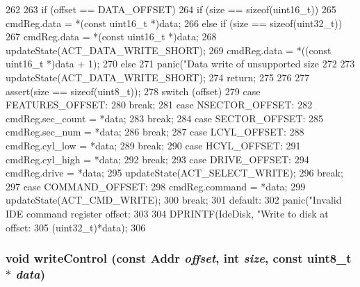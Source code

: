 \begin{DoxyCode}
262 {
263     if (offset == DATA_OFFSET) {
264         if (size == sizeof(uint16_t)) {
265             cmdReg.data = *(const uint16_t *)data;
266         } else if (size == sizeof(uint32_t)) {
267             cmdReg.data = *(const uint16_t *)data;
268             updateState(ACT_DATA_WRITE_SHORT);
269             cmdReg.data = *((const uint16_t *)data + 1);
270         } else {
271             panic("Data write of unsupported size %
272         }
273         updateState(ACT_DATA_WRITE_SHORT);
274         return;
275     }
276 
277     assert(size == sizeof(uint8_t));
278     switch (offset) {
279       case FEATURES_OFFSET:
280         break;
281       case NSECTOR_OFFSET:
282         cmdReg.sec_count = *data;
283         break;
284       case SECTOR_OFFSET:
285         cmdReg.sec_num = *data;
286         break;
287       case LCYL_OFFSET:
288         cmdReg.cyl_low = *data;
289         break;
290       case HCYL_OFFSET:
291         cmdReg.cyl_high = *data;
292         break;
293       case DRIVE_OFFSET:
294         cmdReg.drive = *data;
295         updateState(ACT_SELECT_WRITE);
296         break;
297       case COMMAND_OFFSET:
298         cmdReg.command = *data;
299         updateState(ACT_CMD_WRITE);
300         break;
301       default:
302         panic("Invalid IDE command register offset: %
303     }
304     DPRINTF(IdeDisk, "Write to disk at offset: %
305             (uint32_t)*data);
306 }
\end{DoxyCode}
\hypertarget{classIdeDisk_af8e7a0d1414a2f9b03e2e001e036e87b}{
\subsubsection[{writeControl}]{\setlength{\rightskip}{0pt plus 5cm}void writeControl (const {\bf Addr} {\em offset}, \/  int {\em size}, \/  const uint8\_\-t $\ast$ {\em data})}}
\label{classIdeDisk_af8e7a0d1414a2f9b03e2e001e036e87b}



